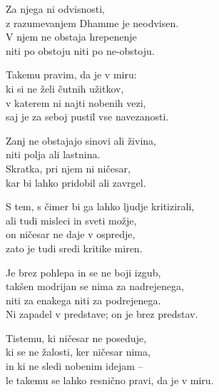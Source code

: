 Za njega ni odvisnosti,\\
z razumevanjem Dhamme je neodvisen.\\
V njem ne obstaja hrepenenje\\
niti po obstoju niti po ne-obstoju.

\clearpage

Takemu pravim, da je v miru:\\
ki si ne želi čutnih užitkov,\\
v katerem ni najti nobenih vezi,\\
saj je za seboj pustil vse navezanosti.

Zanj ne obstajajo sinovi ali živina,\\
niti polja ali lastnina.\\
Skratka, pri njem ni ničesar,\\
kar bi lahko pridobil ali zavrgel.

S tem, s čimer bi ga lahko ljudje kritizirali,\\
ali tudi misleci in sveti možje,\\
on ničesar ne daje v ospredje,\\
zato je tudi sredi kritike miren.

Je brez pohlepa in se ne boji izgub,\\
takšen modrijan se nima za nadrejenega,\\
niti za enakega niti za podrejenega.\\
Ni zapadel v predstave; on je brez predstav.

Tistemu, ki ničesar ne poseduje,\\
ki se ne žalosti, ker ničesar nima,\\
in ki ne sledi nobenim idejam --\\
le takemu se lahko resnično pravi, da je v miru.

